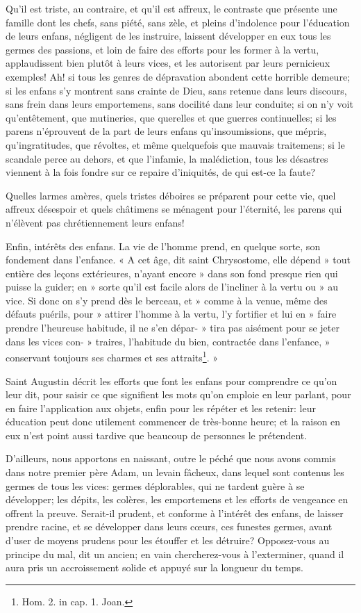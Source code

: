 \documentclass[instructions.tex]{subfiles}
\begin{document}
Qu'il est triste, au contraire, et qu'il est affreux, le contraste que présente une famille dont les chefs, sans piété, sans zèle, et pleins d'indolence pour l'éducation de leurs enfans, négligent de les instruire, laissent développer en eux tous les germes des passions, et loin de faire des efforts pour les former à la vertu, applaudissent bien plutôt à leurs vices, et les autorisent par leurs pernicieux exemples! Ah! si tous les genres de dépravation abondent cette horrible demeure; si les enfans s'y montrent sans crainte de Dieu, sans retenue dans leurs discours, sans frein dans leurs emportemens, sans docilité dans leur conduite; si on n'y voit qu'entêtement, que mutineries, que querelles et que guerres continuelles; si les parens n'éprouvent de la part de leurs enfans qu'insoumissions, que mépris, qu'ingratitudes, que révoltes, et même quelquefois que mauvais traitemens; si le scandale perce au dehors, et que l'infamie, la malédiction, tous les désastres viennent à la fois fondre sur ce repaire d'iniquités, de qui est-ce la faute?
 
Quelles larmes amères, quels tristes déboires se préparent pour cette vie, quel affreux désespoir et quels châtimens se ménagent pour l'éternité, les parens qui n'élèvent pas chrétiennement leurs enfans!
 
Enfin, intérêts des enfans. La vie de l'homme prend, en quelque sorte, son fondement dans l'enfance. « A cet âge, dit saint Chrysostome, elle dépend » tout entière des leçons extérieures, n'ayant encore » dans son fond presque rien qui puisse la guider; en » sorte qu'il est facile alors de l'incliner à la vertu ou » au vice. Si donc on s'y prend dès le berceau, et » comme à la venue, même des défauts puérils, pour » attirer l'homme à la vertu, l'y fortifier et lui en » faire prendre l'heureuse habitude, il ne s'en dépar- » tira pas aisément pour se jeter dans les vices con- » traires, l'habitude du bien, contractée dans l'enfance, » conservant toujours ses charmes et ses attraits\footnote{Hom. 2. in cap. 1. Joan.}. »
 
Saint Augustin décrit les efforts que font les enfans pour comprendre ce qu'on leur dit, pour saisir ce que signifient les mots qu'on emploie en leur parlant, pour en faire l'application aux objets, enfin pour les répéter et les retenir: leur éducation peut donc utilement commencer de très-bonne heure; et la raison en eux n'est point aussi tardive que beaucoup de personnes le prétendent.
 
D'ailleurs, nous apportons en naissant, outre le péché que nous avons commis dans notre premier père Adam, un levain fâcheux, dans lequel sont contenus les germes de tous les vices: germes déplorables, qui ne tardent guère à se développer; les dépits, les colères, les emportemens et les efforts de vengeance en offrent la preuve. Serait-il prudent, et conforme à l'intérêt des enfans, de laisser prendre racine, et se développer dans leurs cœurs, ces funestes germes, avant d'user de moyens prudens pour les étouffer et les détruire? Opposez-vous au principe du mal, dit un ancien; en vain chercherez-vous à l'exterminer, quand il aura pris un accroissement solide et appuyé sur la longueur du temps.
 
\end{document}

